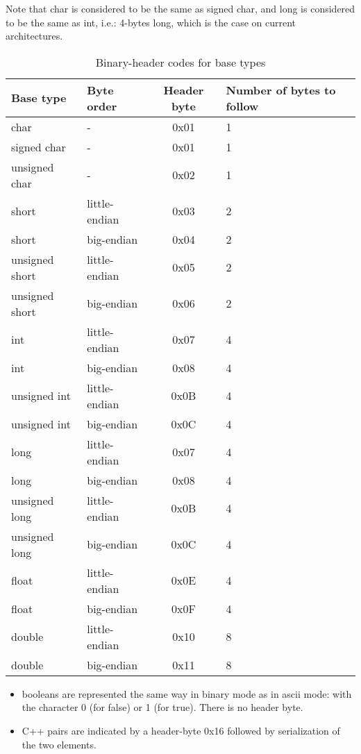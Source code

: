 \documentclass[11pt]{book}
\begin{document}
Note that char is considered to be the same as signed char, and long is
considered to be the same as int, i.e.: 4-bytes long, which is the case on
current architectures.

\begin{table}[h]
\caption{ Binary-header codes for base types }
\label{tab:base-types}
\begin{tabular}{|llcl|} \hline 
Base type      & Byte order    & Header byte & Number of bytes to follow \\ \hline 
char           & -             & 0x01        & 1 \\
signed char    & -             & 0x01        & 1 \\
unsigned char  & -             & 0x02        & 1 \\
short          & little-endian & 0x03        & 2 \\
short          & big-endian    & 0x04        & 2 \\
unsigned short & little-endian & 0x05        & 2 \\
unsigned short & big-endian    & 0x06        & 2 \\
int            & little-endian & 0x07        & 4 \\
int            & big-endian    & 0x08        & 4 \\
unsigned int   & little-endian & 0x0B        & 4 \\
unsigned int   & big-endian    & 0x0C        & 4 \\
long           & little-endian & 0x07        & 4 \\
long           & big-endian    & 0x08        & 4 \\
unsigned long  & little-endian & 0x0B        & 4 \\
unsigned long  & big-endian    & 0x0C        & 4 \\
float          & little-endian & 0x0E        & 4 \\
float          & big-endian    & 0x0F        & 4 \\
double         & little-endian & 0x10        & 8 \\
double         & big-endian    & 0x11        & 8 \\ \hline 
\end{tabular}
\begin{center}
\end{center}
\end{table}

\begin{itemize}
\item booleans are represented the same way in binary mode as in ascii mode: with the character 0 (for false) or 1 (for true). There is no header byte.
\item C++ pairs are indicated by a header-byte 0x16 followed by serialization of the two elements.
\end{itemize}
\end{document}
